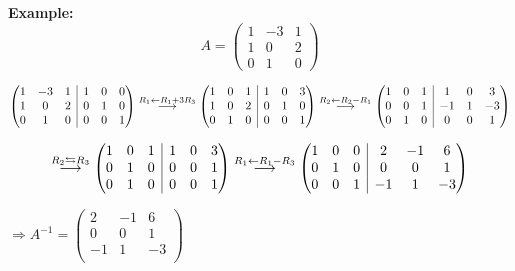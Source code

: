 \documentclass[12pt]{article}
\newcommand{\la}{\leftarrow}
\newcommand{\rvline}{\hspace*{-\arraycolsep}\vline\hspace*{-\arraycolsep}}
\begin{document}
{\color{Brown}
\textbf{Example: }
\[
	A = 
	\begin{pmatrix}
		1 & -3 & 1\\
		1 & 0 & 2\\
		0 & 1 & 0 
	\end{pmatrix}
\]

\[
	\begin{pmatrix}
		1 & -3 & 1 & \rvline & 1 & 0 & 0\\
		1 & 0 & 2 & \rvline & 0 & 1 & 0	\\
		0 & 1 & 0 & \rvline & 0 & 0 & 1	\\
	\end{pmatrix}
	\overset{R_1 \la R_1 + 3R_3}{\longrightarrow}
	\begin{pmatrix}
		1 & 0 & 1 & \rvline & 1 & 0 & 3 \\
		1 & 0 & 2 & \rvline & 0 & 1 & 0	\\
		0 & 1 & 0 & \rvline & 0 & 0 & 1	\\
	\end{pmatrix}
	\overset{R_2 \la R_2 - R_1}{\longrightarrow}
	\begin{pmatrix}
		1 & 0 & 1 & \rvline & 1 & 0 & 3		\\
		0 & 0 & 1 & \rvline & -1 & 1 & -3	\\
		0 & 1 & 0 & \rvline & 0 & 0 & 1		\\
	\end{pmatrix}
\]

\[
	\overset{R_2 \leftrightarrows R_3}{\longrightarrow}
	\begin{pmatrix}
		1 & 0 & 1 & \rvline & 1 & 0 & 3\\
		0 & 1 & 0 & \rvline & 0 & 0& 1	\\
		0 & 1 & 0 & \rvline & 0 & 0 & 1	\\
	\end{pmatrix}
	\overset{R_1 \la R_1 - R_3}{\longrightarrow}
	\begin{pmatrix}
		1 & 0 & 0 & \rvline & 2 & -1 & 6\\
		0 & 1 & 0 & \rvline & 0 & 0 & 1	\\
		0 & 0 & 1 & \rvline & -1 & 1 & -3	\\
	\end{pmatrix}
\]

$\Rightarrow A^{-1} = 
\begin{pmatrix}
	2 & -1 & 6	\\
	0 & 0 & 1	\\
	-1 & 1 & -3	\\
\end{pmatrix}$

}
\end{document}
